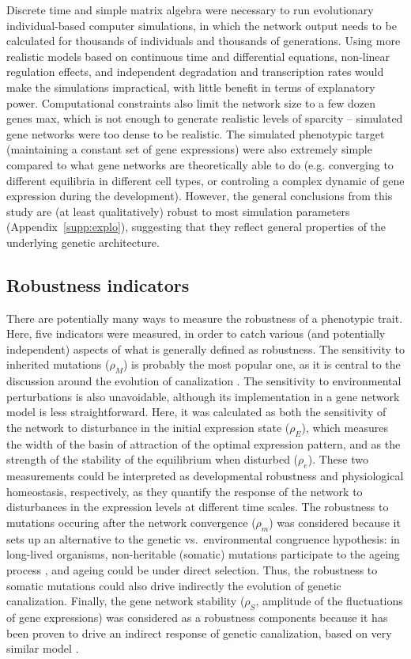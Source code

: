 \documentclass[10pt,a4paper]{article}
\newcommand{\stability}{{\rho_S}}
\newcommand{\earlyenv}{{\rho_E}}
\newcommand{\lateenv}{{\rho_e}}
\newcommand{\earlymut}{{\rho_M}}
\newcommand{\latemut}{{\rho_m}}
\newcommand{\SupMat}{Appendix~}
\begin{document}
Discrete time and simple matrix algebra were necessary to run evolutionary individual-based computer simulations, in which the network output needs to be calculated for thousands of individuals and thousands of generations. Using more realistic models based on continuous time and differential equations, non-linear regulation effects, and independent degradation and transcription rates would make the simulations impractical, with little benefit in terms of explanatory power. Computational constraints also limit the network size to a few dozen genes max, which is not enough to generate realistic levels of sparcity -- simulated gene networks were too dense to be realistic. The simulated phenotypic target (maintaining a constant set of gene expressions) were also extremely simple compared to what gene networks are theoretically able to do (e.g. converging to different equilibria in different cell types, or controling a complex dynamic of gene expression during the development). However, the general conclusions from this study are (at least qualitatively) robust to most simulation parameters (\SupMat \ref{supp:explo}), suggesting that they reflect general properties of the underlying genetic architecture. 

\subsection{Robustness indicators}

There are potentially many ways to measure the robustness of a phenotypic trait. Here, five indicators were measured, in order to catch various (and potentially independent) aspects of what is generally defined as robustness. The sensitivity to inherited mutations ($\earlymut$) is probably the most popular one, as it is central to the discussion around the evolution of canalization \citep{Wad59, Wag96, Far15}. The sensitivity to environmental perturbations is also unavoidable, although its implementation in a gene network model is less straightforward. Here, it was calculated as both the sensitivity of the network to disturbance in the initial expression state ($\earlyenv$), which measures the width of the basin of attraction of the optimal expression pattern, and as the strength of the stability of the equilibrium when disturbed ($\lateenv$). These two measurements could be interpreted as developmental robustness and physiological homeostasis, respectively, as they quantify the response of the network to disturbances in the expression levels at different time scales. The robustness to mutations occuring after the network convergence ($\latemut$) was considered because it sets up an alternative to the genetic vs.\ environmental congruence hypothesis: in long-lived organisms, non-heritable (somatic) mutations participate to the ageing process \citep{KLH12}, and ageing could be under direct selection. Thus, the robustness to somatic mutations could also drive indirectly the evolution of genetic canalization. Finally, the gene network stability ($\stability$, amplitude of the fluctuations of gene expressions) was considered as a robustness components because it has been proven to drive an indirect response of genetic canalization, based on very similar model \citep{SB02}. 
\end{document}
